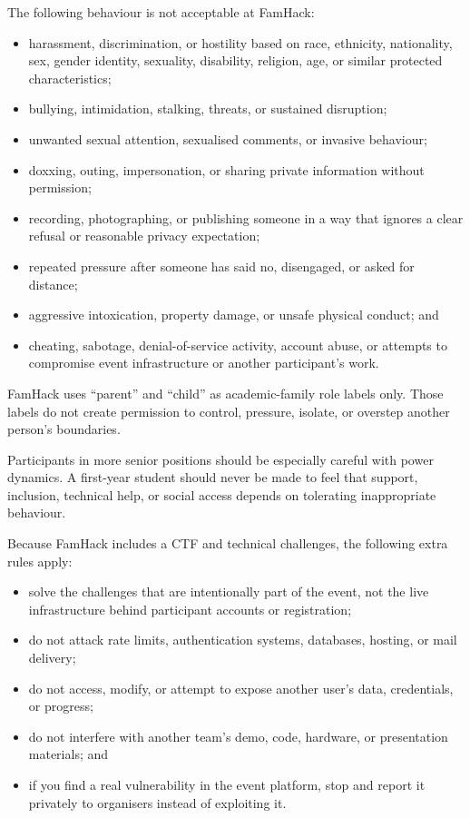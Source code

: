 \documentclass[11pt]{article}
\begin{document}
\newpage
{}
The following behaviour is not acceptable at FamHack:
\begin{itemize}
  \item harassment, discrimination, or hostility based on race, ethnicity, nationality, sex, gender identity, sexuality, disability, religion, age, or similar protected characteristics;
  \item bullying, intimidation, stalking, threats, or sustained disruption;
  \item unwanted sexual attention, sexualised comments, or invasive behaviour;
  \item doxxing, outing, impersonation, or sharing private information without permission;
  \item recording, photographing, or publishing someone in a way that ignores a clear refusal or reasonable privacy expectation;
  \item repeated pressure after someone has said no, disengaged, or asked for distance;
  \item aggressive intoxication, property damage, or unsafe physical conduct; and
  \item cheating, sabotage, denial-of-service activity, account abuse, or attempts to compromise event infrastructure or another participant's work.
\end{itemize}

FamHack uses ``parent'' and ``child'' as academic-family role labels only. Those labels do not create permission to control, pressure, isolate, or overstep another person's boundaries.

Participants in more senior positions should be especially careful with power dynamics. A first-year student should never be made to feel that support, inclusion, technical help, or social access depends on tolerating inappropriate behaviour.

Because FamHack includes a CTF and technical challenges, the following extra rules apply:
\begin{itemize}
  \item solve the challenges that are intentionally part of the event, not the live infrastructure behind participant accounts or registration;
  \item do not attack rate limits, authentication systems, databases, hosting, or mail delivery;
  \item do not access, modify, or attempt to expose another user's data, credentials, or progress;
  \item do not interfere with another team's demo, code, hardware, or presentation materials; and
  \item if you find a real vulnerability in the event platform, stop and report it privately to organisers instead of exploiting it.
\end{itemize}
\end{document}
